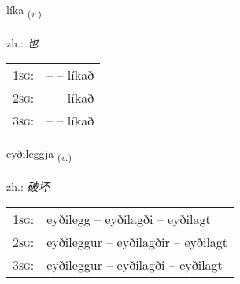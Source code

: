 \documentclass[frontgrid, backgrid]{flacards}\usepackage[]{graphicx}\usepackage[]{xcolor}
\begin{document}
\renewcommand{\flhead}{\vskip5pt \fboxsep=0pt {\small\bfseries\footnotesize Sagnorð | 动词}}
\renewcommand{\fcfoot}{\vskip5pt \fboxsep=0pt \hspace{2pt}{\small\bfseries\footnotesize 3K}}

\renewcommand{\blhead}{\vskip5pt {\small\bfseries\footnotesize Sagnorð | 动词 }}
\renewcommand{\bcfoot}{\vskip5pt \hspace{2pt}{\small\bfseries\footnotesize 3K}}


{líka \small{\textsubscript{(\textit{v.})}} \\[1ex] %
\textphonetic{[liːka]} \\
zh.: \emph{也} \\  [2ex]
\renewcommand*{\arraystretch}{0.8}
\begin{tabular}{p{1cm}l}
\textsc{1sg}: &  --  -- líkað \\ 
\textsc{2sg}: &  --  -- líkað \\ 
\textsc{3sg}: &  --  -- líkað \\ 
\end{tabular}
}

\renewcommand{\flhead}{\vskip5pt \fboxsep=0pt {\small\bfseries\footnotesize Sagnorð | 动词}}
\renewcommand{\fcfoot}{\vskip5pt \fboxsep=0pt \hspace{2pt}{\small\bfseries\footnotesize 3K}}

\renewcommand{\blhead}{\vskip5pt {\small\bfseries\footnotesize Sagnorð | 动词 }}
\renewcommand{\bcfoot}{\vskip5pt \hspace{2pt}{\small\bfseries\footnotesize 3K}}


{eyðileggja \small{\textsubscript{(\textit{v.})}} \\[1ex] %
\textphonetic{[eiːðɪlɛca]} \\
zh.: \emph{破坏} \\  [2ex]
\renewcommand*{\arraystretch}{0.8}
\begin{tabular}{p{1cm}l}
\textsc{1sg}: & eyðilegg -- eyðilagði -- eyðilagt \\ 
\textsc{2sg}: & eyðileggur -- eyðilagðir -- eyðilagt \\ 
\textsc{3sg}: & eyðileggur -- eyðilagði -- eyðilagt \\ 
\end{tabular}
}
\end{document}

